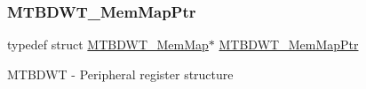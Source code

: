 \subsubsection{\texorpdfstring{M\+T\+B\+D\+W\+T\+\_\+\+Mem\+Map\+Ptr}{MTBDWT\_MemMapPtr}}
{\footnotesize\ttfamily typedef struct \hyperlink{struct_m_t_b_d_w_t___mem_map}{M\+T\+B\+D\+W\+T\+\_\+\+Mem\+Map}$\ast$ \hyperlink{group___m_t_b_d_w_t___peripheral_ga8dd9bf791ed255926ccd995a6236caaf}{M\+T\+B\+D\+W\+T\+\_\+\+Mem\+Map\+Ptr}}

M\+T\+B\+D\+WT -\/ Peripheral register structure 